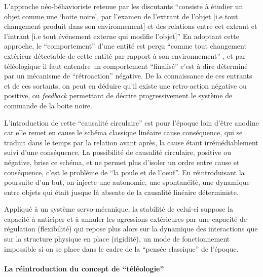 L'approche néo-béhavioriste retenue par les discutants \enquote{consiste à étudier un objet comme une \enquote{boite noire}, par l'examen de l'extrant de l'objet [i.e tout changement produit dans son environnement] et des relations entre cet extrant et l'intrant [i.e tout événement externe qui modifie l'objet]} \autocite{Pouvreau2013} En adoptant cette approche, le \enquote{comportement} d'une entité est perçu \enquote{comme tout changement extérieur détectable de cette entité par rapport à son environnement} , et par téléologique il faut entendre un comportement \enquote{finalisé} c'est à dire déterminé par un mécanisme de \enquote{rétroaction} négative. De la connaissance de ces entrants et de ces sortants, on peut en déduire qu'il existe une retro-action négative ou positive, ou \textit{feedback} permettant de décrire progressivement le système de commande de la boite noire.

L'introduction de cette \enquote{causalité circulaire} est pour l'époque loin d'être anodine car elle remet en cause le schéma classique linéaire cause \textrightarrow conséquence, qui se traduit dans le temps par la relation avant \textrightarrow après, la cause étant irrémédiablement suivi d'une conséquence. La possibilité de causalité circulaire, positive ou négative, brise ce schéma, et ne permet plus d'isoler un ordre entre cause et conséquence, c'est le problème de \enquote{la poule et de l'oeuf}. En réintroduisant la poursuite d'un but, on injecte une autonomie, une spontanéité, une dynamique entre objets qui était jusque là absente de la causalité linéaire déterministe.

Appliqué à un système servo-mécanique, la stabilité de celui-ci suppose la capacité à anticiper et à annuler les agressions extérieures par une capacité de régulation (flexibilité) qui repose plus alors sur la dynamique des interactions que sur la structure physique en place (rigidité), un mode de fonctionnement impossible si on se place dans le cadre de la \enquote{pensée classique} de l'époque.


\paragraph{La réintroduction du concept de \enquote{téléologie}}

